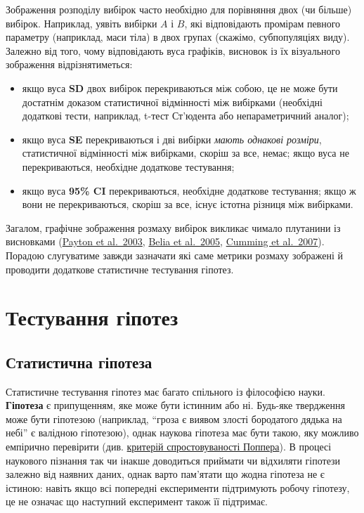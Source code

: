 \documentclass[
  11pt,
]{book}
\begin{document}
Зображення розподілу вибірок часто необхідно для порівняння двох (чи більше) вибірок. Наприклад, уявіть вибірки \(A\) і \(B\), які відповідають промірам певного параметру (наприклад, маси тіла) в двох групах (скажімо, субпопуляціях виду). Залежно від того, чому відповідають вуса графіків, висновок із їх візуального зображення відрізнятиметься:

\begin{itemize}
\item
  якщо вуса \textbf{SD} двох вибірок перекриваються між собою, це не може бути достатнім доказом статистичної відмінності між вибірками (необхідні додаткові тести, наприклад, t-тест Ст'юдента або непараметричний аналог);
\item
  якщо вуса \textbf{SE} перекриваються і дві вибірки \emph{мають однакові розміри}, статистичної відмінності між вибірками, скоріш за все, немає; якщо вуса не перекриваються, необхідне додаткове тестування;
\item
  якщо вуса \textbf{95\% CI} перекриваються, необхідне додаткове тестування; якщо ж вони не перекриваються, скоріш за все, існує істотна різниця між вибірками.
\end{itemize}

Загалом, графічне зображення розмаху вибірок викликає чимало плутанини із висновками (\href{https://doi.org/10.1093/jis/3.1.34}{Payton et al.~2003}, \href{https://doi.org/10.1037/1082-989X.10.4.389}{Belia et al.~2005}, \href{https://doi.org/10.1083/jcb.200611141}{Cumming et al.~2007}). Порадою слугуватиме завжди зазначати які саме метрики розмаху зображені й проводити додаткове статистичне тестування гіпотез.

\section{Тестування гіпотез}\label{basic-hypotheses}

\subsection{Статистична гіпотеза}\label{hypothesis}

Статистичне тестування гіпотез має багато спільного із філософією науки. \textbf{Гіпотеза} є припущенням, яке може бути істинним або ні. Будь-яке твердження може бути гіпотезою (наприклад, ``гроза є виявом злості бородатого дядька на небі'' є валідною гіпотезою), однак наукова гіпотеза має бути такою, яку можливо емпірично перевірити (див. \href{https://uk.wikipedia.org/wiki/\%D0\%A1\%D0\%BF\%D1\%80\%D0\%BE\%D1\%81\%D1\%82\%D0\%BE\%D0\%B2\%D1\%83\%D0\%B2\%D0\%B0\%D0\%BD\%D1\%96\%D1\%81\%D1\%82\%D1\%8C}{критерій спростовуваності Поппера}). В процесі наукового пізнання так чи інакше доводиться приймати чи відхиляти гіпотези залежно від наявних даних, однак варто пам'ятати що жодна гіпотеза не є істиною: навіть якщо всі попередні експерименти підтримують робочу гіпотезу, це не означає що наступний експеримент також її підтримає.
\end{document}
